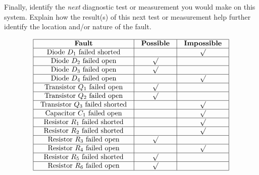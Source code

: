 Finally, identify the {\it next} diagnostic test or measurement you would make on this system.  Explain how the result(s) of this next test or measurement help further identify the location and/or nature of the fault.

\vfil 

\eject







$$\vbox{\offinterlineskip
\halign{\strut
\vrule \quad\hfil # \ \hfil & 
\vrule \quad\hfil # \ \hfil & 
\vrule \quad\hfil # \ \hfil \vrule \cr
\noalign{\hrule}
%
{\bf Fault} & {\bf Possible} & {\bf Impossible} \cr
%
\noalign{\hrule}
%
Diode $D_1$ failed shorted &  & $\surd$ \cr
%
\noalign{\hrule}
%
Diode $D_2$ failed open & $\surd$ &  \cr
%
\noalign{\hrule}
%
Diode $D_3$ failed open & $\surd$ &  \cr
%
\noalign{\hrule}
%
Diode $D_4$ failed open &  & $\surd$ \cr
%
\noalign{\hrule}
%
Transistor $Q_1$ failed open & $\surd$ &  \cr
%
\noalign{\hrule}
%
Transistor $Q_2$ failed open & $\surd$ &  \cr
%
\noalign{\hrule}
%
Transistor $Q_3$ failed shorted &  & $\surd$ \cr
%
\noalign{\hrule}
%
Capacitor $C_1$ failed open &  & $\surd$ \cr
%
\noalign{\hrule}
%
Resistor $R_1$ failed shorted &  & $\surd$ \cr
%
\noalign{\hrule}
%
Resistor $R_2$ failed shorted &  & $\surd$ \cr
%
\noalign{\hrule}
%
Resistor $R_3$ failed open & $\surd$ &  \cr
%
\noalign{\hrule}
%
Resistor $R_4$ failed open &  & $\surd$ \cr
%
\noalign{\hrule}
%
Resistor $R_5$ failed shorted & $\surd$ &  \cr
%
\noalign{\hrule}
%
Resistor $R_6$ failed open & $\surd$ &  \cr
%
\noalign{\hrule}
} %
}$$ %











